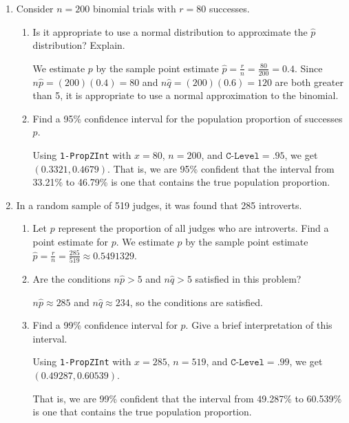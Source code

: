 \begin{enumerate}

\item Consider $n=200$ binomial trials with $r=80$ successes.
	\begin{enumerate}
	\item Is it appropriate to use a normal distribution to approximate the $\hat{p}$ distribution? Explain. 
	
	{\answer We estimate $p$ by the sample point estimate $\hat{p} = \frac{r}{n} = \frac{80}{200} = 0.4$. 
	Since $n\hat{p} = (200)(0.4) = 80$ and $n\hat{q} = (200)(0.6) = 120$ are both greater than 5, it is appropriate to use a normal approximation to the binomial.
	} 
	
	\item Find a 95\% confidence interval for the population proportion of successes $p$. 
	
	{\answer Using \texttt{1-PropZInt} with $x=80$, $n=200$, and $\texttt{C-Level} = .95$, we get $(0.3321, 0.4679)$. That is, we are 95\% confident that the interval from 33.21\% to 46.79\% is one that contains the true population proportion.
	} 
	\end{enumerate}
	
\item In a random sample of 519 judges, it was found that 285 introverts.
	\begin{enumerate}
	\item Let $p$ represent the proportion of all judges who are introverts. Find a point estimate for $p$. 
	{\answer We estimate $p$ by the sample point estimate $\hat{p} = \frac{r}{n} = \frac{285}{519} \approx 0.5491329$.
	} 
	
	\item Are the conditions $n\hat{p} >5$ and $n\hat{q}>5$ satisfied in this problem? 
	
	{\answer $n\hat{p} \approx 285$ and $n\hat{q} \approx 234$, so the conditions are satisfied.
	} 
	
	\item Find a 99\% confidence interval for $p$. Give a brief interpretation of this interval. 
	
	{\answer Using \texttt{1-PropZInt} with $x=285$, $n=519$, and $\texttt{C-Level} = .99$, we get $(0.49287, 0.60539)$. 
	
	That is, we are 99\% confident that the interval from 49.287\% to 60.539\% is one that contains the true population proportion.
	} 
	\end{enumerate}


\end{enumerate}
